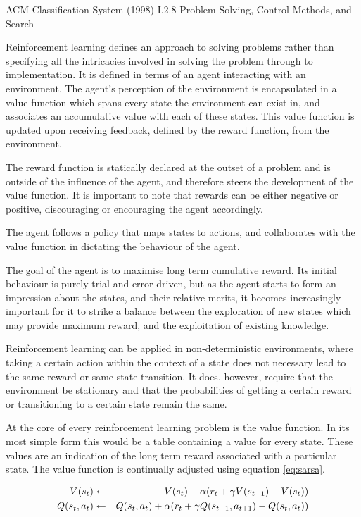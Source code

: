 \documentclass{rucsthesis}
\begin{document}
ACM Classification System (1998) I.2.8 Problem Solving, Control Methods, and Search

Reinforcement learning defines an approach to solving problems rather than specifying all the intricacies involved in solving the problem through to implementation. It is defined in terms of an agent interacting with an environment. The agent's perception of the environment is encapsulated in a value function which spans every state the environment can exist in, and associates an accumulative value with each of these states. This value function is updated upon receiving feedback, defined by the reward function, from the environment. 

The reward function is statically declared at the outset of a problem and is outside of the influence of the agent, and therefore steers the development of the value function. It is important to note that rewards can be either negative or positive, discouraging or encouraging the agent accordingly. 

The agent follows a policy that maps states to actions, and collaborates with the value function in dictating the behaviour of the agent\citep{suttonbarto}.

The goal of the agent is to maximise long term cumulative reward. Its initial behaviour is purely trial and error driven, but as the agent starts to form an impression about the states, and their relative merits, it becomes increasingly important for it to strike a balance between the exploration of new states which may provide maximum reward, and the exploitation of existing knowledge\citep{suttonbarto}.

Reinforcement learning can be applied in non-deterministic environments, where taking a certain action within the context of a state does not necessary lead to the same reward or same state transition. It does, however, require that the environment be stationary and that the probabilities of getting a certain reward or transitioning to a certain state remain the same\citep{kaelbling96reinforcement}. 

At the core of every reinforcement learning problem is the value function. In its most simple form this would be a table containing a value for every state. These values are an indication of the long term reward associated with a particular state. The value function is continually adjusted using equation \ref{eq:sarsa}. 

\begin{eqnarray}
\centering
V(s_t) & \leftarrow & V(s_t) + \alpha(r_{t} + \gamma V(s_{t+1}) - V(s_t)) \label{eq:astates} \\
Q(s_t,a_t) & \leftarrow & Q(s_t,a_t) + \alpha(r_{t} + \gamma Q(s_{t+1},a_{t+1}) - Q(s_t,a_t)) \label{eq:sarsa}
\end{eqnarray}
\end{document}
